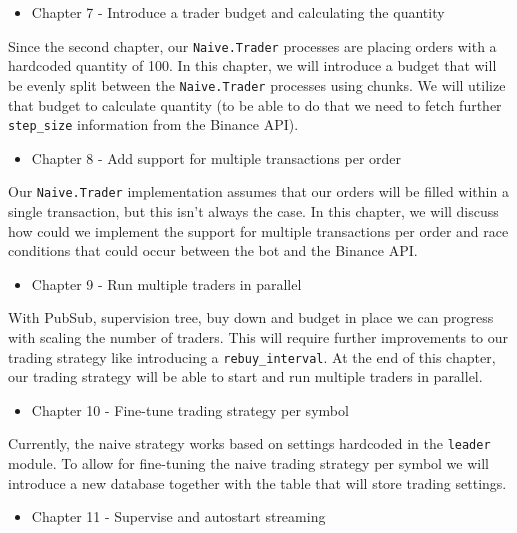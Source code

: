 \documentclass[
  oneside]{book}
\providecommand{\tightlist}{%
  \setlength{\itemsep}{0pt}\setlength{\parskip}{0pt}}
\begin{document}
\begin{itemize}
\tightlist
\item
  Chapter 7 - Introduce a trader budget and calculating the quantity
\end{itemize}

Since the second chapter, our \texttt{Naive.Trader} processes are placing orders with a hardcoded quantity of 100. In this chapter, we will introduce a budget that will be evenly split between the \texttt{Naive.Trader} processes using chunks. We will utilize that budget to calculate quantity (to be able to do that we need to fetch further \texttt{step\_size} information from the Binance API).

\begin{itemize}
\tightlist
\item
  Chapter 8 - Add support for multiple transactions per order
\end{itemize}

Our \texttt{Naive.Trader} implementation assumes that our orders will be filled within a single transaction, but this isn't always the case. In this chapter, we will discuss how could we implement the support for multiple transactions per order and race conditions that could occur between the bot and the Binance API.

\begin{itemize}
\tightlist
\item
  Chapter 9 - Run multiple traders in parallel
\end{itemize}

With PubSub, supervision tree, buy down and budget in place we can progress with scaling the number of traders. This will require further improvements to our trading strategy like introducing a \texttt{rebuy\_interval}. At the end of this chapter, our trading strategy will be able to start and run multiple traders in parallel.

\begin{itemize}
\tightlist
\item
  Chapter 10 - Fine-tune trading strategy per symbol
\end{itemize}

Currently, the naive strategy works based on settings hardcoded in the \texttt{leader} module. To allow for fine-tuning the naive trading strategy per symbol we will introduce a new database together with the table that will store trading settings.

\begin{itemize}
\tightlist
\item
  Chapter 11 - Supervise and autostart streaming
\end{itemize}
\end{document}
